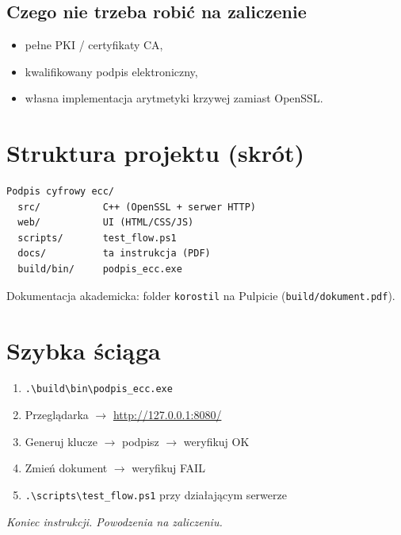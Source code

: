 \documentclass[12pt,a4paper]{article}
\begin{document}
\subsection{Czego nie trzeba robić na zaliczenie}
\begin{itemize}[leftmargin=*]
  \item pełne PKI / certyfikaty CA,
  \item kwalifikowany podpis elektroniczny,
  \item własna implementacja arytmetyki krzywej zamiast OpenSSL.
\end{itemize}

\section{Struktura projektu (skrót)}

\begin{verbatim}
Podpis cyfrowy ecc/
  src/           C++ (OpenSSL + serwer HTTP)
  web/           UI (HTML/CSS/JS)
  scripts/       test_flow.ps1
  docs/          ta instrukcja (PDF)
  build/bin/     podpis_ecc.exe
\end{verbatim}

Dokumentacja akademicka: folder \texttt{korostil} na Pulpicie (\texttt{build/dokument.pdf}).

\section{Szybka ściąga}

\begin{enumerate}[leftmargin=*]
  \item \texttt{.\textbackslash build\textbackslash bin\textbackslash podpis\_ecc.exe}
  \item Przeglądarka $\rightarrow$ \url{http://127.0.0.1:8080/}
  \item Generuj klucze $\rightarrow$ podpisz $\rightarrow$ weryfikuj OK
  \item Zmień dokument $\rightarrow$ weryfikuj FAIL
  \item \texttt{.\textbackslash scripts\textbackslash test\_flow.ps1} przy działającym serwerze
\end{enumerate}

\vspace{1.5em}
\noindent\textit{Koniec instrukcji. Powodzenia na zaliczeniu.}
\end{document}
